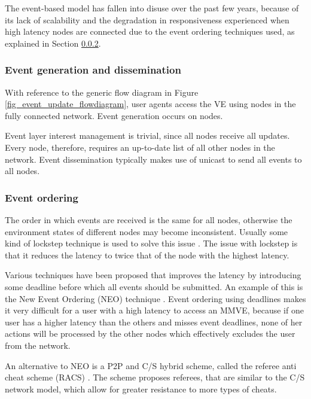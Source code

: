 The event-based model has fallen into disuse over the past few years, because of its lack of scalability and the degradation in responsiveness experienced when high latency nodes are connected due to the event ordering techniques used, as explained in Section \ref{event_based_event_ordering}.

\subsubsection{Event generation and dissemination}

With reference to the generic flow diagram in Figure \ref{fig_event_update_flowdiagram}, user agents access the VE using nodes in the fully connected network. Event generation occurs on nodes.

Event layer interest management is trivial, since all nodes receive all updates. Every node, therefore, requires an up-to-date list of all other nodes in the network. Event dissemination typically makes use of unicast to send all events to all nodes.

\subsubsection{Event ordering}
\label{event_based_event_ordering}

The order in which events are received is the same for all nodes, otherwise the environment states of different nodes may become inconsistent.
Usually some kind of lockstep technique is used to solve this issue \cite{pessimistic_lock_step}. The issue with lockstep is that it reduces the latency to twice that of the node with the highest latency.

Various techniques have been proposed that improves the latency by introducing some deadline before which all events should be submitted. An example of this is the New Event Ordering (NEO) technique \cite{cheat_proof_event_ordering}. Event ordering using deadlines makes it very difficult for a user with a high latency to access an MMVE, because if one user has a higher latency than the others and misses event deadlines, none of her actions will be processed by the other nodes which effectively excludes the user from the network.

An alternative to NEO is a P2P and C/S hybrid scheme, called the referee anti cheat scheme (RACS) \cite{cheating_taxonomy}. The scheme proposes referees, that are similar to the C/S network model, which allow for greater resistance to more types of cheats.

